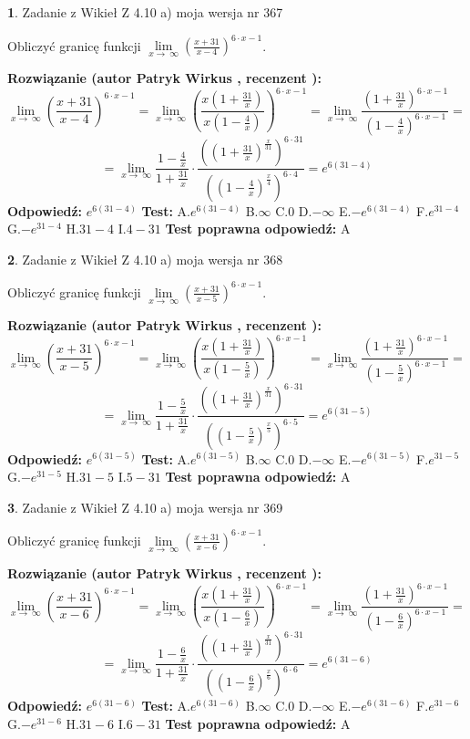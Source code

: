 \documentclass[12pt, a4paper]{article}
\theoremstyle{definition} %
\newtheorem{zad}{}
\newcommand{\zadStart}[1]{\begin{zad}#1\newline}
\newcommand{\zadStop}{\end{zad}}
\newcommand{\rozwStart}[2]{\noindent \textbf{Rozwiązanie (autor #1 , recenzent #2): }\newline}
\newcommand{\rozwStop}{\newline}
\newcommand{\odpStart}{\noindent \textbf{Odpowiedź:}\newline}
\newcommand{\odpStop}{\newline}
\newcommand{\testStart}{\noindent \textbf{Test:}\newline}
\newcommand{\testStop}{\newline}
\newcommand{\kluczStart}{\noindent \textbf{Test poprawna odpowiedź:}\newline}
\newcommand{\kluczStop}{\newline}
\begin{document}
\zadStart{Zadanie z Wikieł Z 4.10 a) moja wersja nr 367}


Obliczyć granicę funkcji  $\lim\limits_{x\to\ \infty}(\frac{x+31}{x-4})^{6\cdot x-1}$.
\zadStop
\rozwStart{Patryk Wirkus}{}
$$\lim\limits_{x\to\ \infty}(\frac{x+31}{x-4})^{6\cdot x-1} = \lim\limits_{x\to\ \infty}(\frac{x(1+\frac{31}{x})}{x(1-\frac{4}{x})})^{6\cdot x-1}=\lim\limits_{x\to\ \infty}\frac{(1+\frac{31}{x})^{6\cdot x-1}}{(1-\frac{4}{x})^{6\cdot x-1}}=$$
$$=\lim\limits_{x\to\ \infty}\frac{1-\frac{4}{x}}{1+\frac{31}{x}}\cdot\frac{((1+\frac{31}{x})^{\frac{x}{31}})^{6\cdot31}}{((1-\frac{4}{x})^{\frac{x}{4}})^{6\cdot4}}=e^{6(31-4)}$$
\rozwStop
\odpStart
$e^{6(31-4)}$
\odpStop
\testStart
A.$e^{6(31-4)}$ B.$\infty$ C.$0$ D.$-\infty$ E.$-e^{6(31-4)}$
F.$e^{31-4}$ G.$-e^{31-4}$
H.$31-4$
I.$4-31$
\testStop
\kluczStart
A
\kluczStop



\zadStart{Zadanie z Wikieł Z 4.10 a) moja wersja nr 368}


Obliczyć granicę funkcji  $\lim\limits_{x\to\ \infty}(\frac{x+31}{x-5})^{6\cdot x-1}$.
\zadStop
\rozwStart{Patryk Wirkus}{}
$$\lim\limits_{x\to\ \infty}(\frac{x+31}{x-5})^{6\cdot x-1} = \lim\limits_{x\to\ \infty}(\frac{x(1+\frac{31}{x})}{x(1-\frac{5}{x})})^{6\cdot x-1}=\lim\limits_{x\to\ \infty}\frac{(1+\frac{31}{x})^{6\cdot x-1}}{(1-\frac{5}{x})^{6\cdot x-1}}=$$
$$=\lim\limits_{x\to\ \infty}\frac{1-\frac{5}{x}}{1+\frac{31}{x}}\cdot\frac{((1+\frac{31}{x})^{\frac{x}{31}})^{6\cdot31}}{((1-\frac{5}{x})^{\frac{x}{5}})^{6\cdot5}}=e^{6(31-5)}$$
\rozwStop
\odpStart
$e^{6(31-5)}$
\odpStop
\testStart
A.$e^{6(31-5)}$ B.$\infty$ C.$0$ D.$-\infty$ E.$-e^{6(31-5)}$
F.$e^{31-5}$ G.$-e^{31-5}$
H.$31-5$
I.$5-31$
\testStop
\kluczStart
A
\kluczStop



\zadStart{Zadanie z Wikieł Z 4.10 a) moja wersja nr 369}


Obliczyć granicę funkcji  $\lim\limits_{x\to\ \infty}(\frac{x+31}{x-6})^{6\cdot x-1}$.
\zadStop
\rozwStart{Patryk Wirkus}{}
$$\lim\limits_{x\to\ \infty}(\frac{x+31}{x-6})^{6\cdot x-1} = \lim\limits_{x\to\ \infty}(\frac{x(1+\frac{31}{x})}{x(1-\frac{6}{x})})^{6\cdot x-1}=\lim\limits_{x\to\ \infty}\frac{(1+\frac{31}{x})^{6\cdot x-1}}{(1-\frac{6}{x})^{6\cdot x-1}}=$$
$$=\lim\limits_{x\to\ \infty}\frac{1-\frac{6}{x}}{1+\frac{31}{x}}\cdot\frac{((1+\frac{31}{x})^{\frac{x}{31}})^{6\cdot31}}{((1-\frac{6}{x})^{\frac{x}{6}})^{6\cdot6}}=e^{6(31-6)}$$
\rozwStop
\odpStart
$e^{6(31-6)}$
\odpStop
\testStart
A.$e^{6(31-6)}$ B.$\infty$ C.$0$ D.$-\infty$ E.$-e^{6(31-6)}$
F.$e^{31-6}$ G.$-e^{31-6}$
H.$31-6$
I.$6-31$
\testStop
\kluczStart
A
\kluczStop
\end{document}
